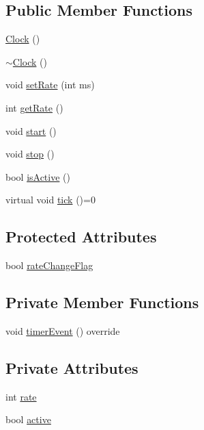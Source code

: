 \subsection*{Public Member Functions}
\begin{DoxyCompactItemize}
\item 
\hyperlink{classdrumpi_1_1clock_1_1Clock_adbc370eb6b5f8d01645cf440188160a8}{Clock} ()
\item 
\hyperlink{classdrumpi_1_1clock_1_1Clock_afc976ce68fa85e15cc06f9ed47bddb7c}{$\sim$\+Clock} ()
\item 
void \hyperlink{classdrumpi_1_1clock_1_1Clock_aa9727786f11c753730901fee28cde1ea}{set\+Rate} (int ms)
\item 
int \hyperlink{classdrumpi_1_1clock_1_1Clock_a329b705dad4e8949df7dde09d74b096f}{get\+Rate} ()
\item 
void \hyperlink{classdrumpi_1_1clock_1_1Clock_a8a050959dcff11c85d695989e9099a8c}{start} ()
\item 
void \hyperlink{classdrumpi_1_1clock_1_1Clock_a0b77c3e7f33eb7ae0f018e469d96a250}{stop} ()
\item 
bool \hyperlink{classdrumpi_1_1clock_1_1Clock_a7ea74e7a255c6b426b238982a9e0f349}{is\+Active} ()
\item 
virtual void \hyperlink{classdrumpi_1_1clock_1_1Clock_ade9259c06e6b90bbd92e155a2506d3a1}{tick} ()=0
\end{DoxyCompactItemize}
\subsection*{Protected Attributes}
\begin{DoxyCompactItemize}
\item 
bool \hyperlink{classdrumpi_1_1clock_1_1Clock_a2aa2272f59486b414cedf1345bcf8ea1}{rate\+Change\+Flag}
\end{DoxyCompactItemize}
\subsection*{Private Member Functions}
\begin{DoxyCompactItemize}
\item 
void \hyperlink{classdrumpi_1_1clock_1_1Clock_a2ff18f1fc7761649a9183676b57d543f}{timer\+Event} () override
\end{DoxyCompactItemize}
\subsection*{Private Attributes}
\begin{DoxyCompactItemize}
\item 
int \hyperlink{classdrumpi_1_1clock_1_1Clock_a1ee7e7ba3f9f481c1b9cc9dd72d0e5a9}{rate}
\item 
bool \hyperlink{classdrumpi_1_1clock_1_1Clock_a4ffd1ce8a9bbc4b2fd082f345d81376b}{active}
\end{DoxyCompactItemize}


